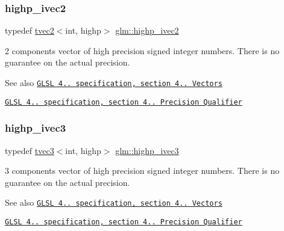 \subsubsection{\texorpdfstring{highp\+\_\+ivec2}{highp\_ivec2}}
{\footnotesize\ttfamily typedef \hyperlink{structglm_1_1tvec2}{tvec2}$<$int, highp$>$ \hyperlink{group__core__precision_ga01acd79fbbe3d93a532276586b5c39ee}{glm\+::highp\+\_\+ivec2}}

2 components vector of high precision signed integer numbers. There is no guarantee on the actual precision.

\begin{DoxySeeAlso}{See also}
\href{http://www.opengl.org/registry/doc/GLSLangSpec.4.20.8.pdf}{\tt G\+L\+SL 4.. specification, section 4.. Vectors} 

\href{http://www.opengl.org/registry/doc/GLSLangSpec.4.20.8.pdf}{\tt G\+L\+SL 4.. specification, section 4.. Precision Qualifier} 
\end{DoxySeeAlso}
\mbox{\label{group__core__precision_gaef51de6bc442bfce2602dc301708720a}} 
\subsubsection{\texorpdfstring{highp\+\_\+ivec3}{highp\_ivec3}}
{\footnotesize\ttfamily typedef \hyperlink{structglm_1_1tvec3}{tvec3}$<$int, highp$>$ \hyperlink{group__core__precision_gaef51de6bc442bfce2602dc301708720a}{glm\+::highp\+\_\+ivec3}}

3 components vector of high precision signed integer numbers. There is no guarantee on the actual precision.

\begin{DoxySeeAlso}{See also}
\href{http://www.opengl.org/registry/doc/GLSLangSpec.4.20.8.pdf}{\tt G\+L\+SL 4.. specification, section 4.. Vectors} 

\href{http://www.opengl.org/registry/doc/GLSLangSpec.4.20.8.pdf}{\tt G\+L\+SL 4.. specification, section 4.. Precision Qualifier} 
\end{DoxySeeAlso}
\mbox{\label{group__core__precision_ga9303c2a9e1f1e761961eeecbcda2d34f}} 
